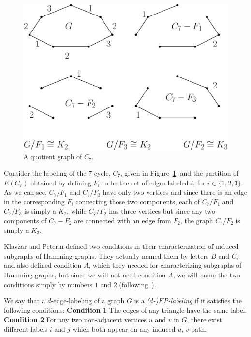 \documentclass[12pt,a4paper,titlepage,openany]{report}
\begin{document}
\begin{figure}[h!]
\begin{center}
\includegraphics[width=0.8\linewidth]{figures/quotientgraph.png}
\end{center}
\caption{A quotient graph of $C_7$.}\label{quotientgraphc7}
\end{figure}

Consider the labeling of the 7-cycle, $C_7$, given in Figure~\ref{quotientgraphc7}, and the partition of $E(C_7)$ obtained by defining $F_i$ to be the set of edges labeled $i$, for $i\in \{1,2,3\}$. As we can see, $C_7/ F_1$ and $C_7/F_3$ have only two vertices and since there is an edge in the corresponding $F_i$ connecting those two components, each of  $C_7/ F_1$ and $C_7/F_3$ is simply a $K_2$, while $C_7/ F_2$ has three vertices but since any two components of $C_7-F_2$ are connected with an edge from $F_2$, the graph $C_7/ F_2$ is simply a $K_3$.

Klav\v zar and Peterin defined two conditions in their characterization of induced subgraphs of Hamming graphs. They actually named them by letters $B$ and $C$, and also defined condition $A$, which they needed for characterizing subgraphs of Hamming graphs,
but since we will not need condition $A$, we will name the two conditions simply by numbers $1$ and $2$ (following~\cite{Milanic}).

We say that  a $d$-edge-labeling of a graph $G$ is a \emph{($d$-)KP-labeling} if it satisfies the following conditions:
\newline
\textbf{Condition 1} The edges of any triangle have the same label.\newline
\textbf{Condition 2} For any two non-adjacent vertices $u$ and $v$ in $G$, there exist different labels $i$ and $j$ which both appear on any induced $u$, $v$-path.
\end{document}
